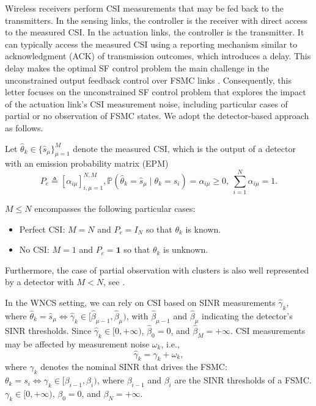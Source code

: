 \documentclass[journal,twoside,web]{ieeecolor}
\begin{document}
Wireless receivers perform CSI measurements that may be fed back to the transmitters. In the sensing links, the controller is the receiver with direct access to the measured CSI. In the actuation links, the controller is the transmitter. It can typically access the measured CSI using a reporting mechanism similar to acknowledgment (ACK) of transmission outcomes, which introduces a delay. This delay makes the optimal SF control problem the main challenge in the unconstrained output feedback control over FSMC links \cite{impicciatore2024tac}. Consequently, this letter focuses on the unconstrained SF control problem that explores the impact of the actuation link's CSI measurement noise, including particular cases of partial or no observation of FSMC states. We adopt the detector-based approach as follows.

Let $\hat{\theta}_k \in \{\hat{s}_{\mu}\}_{\mu=1}^{M}$ denote the measured CSI, which is the output of a detector with an emission probability matrix (EPM)
\begin{subequations}
\begin{equation}\label{eq:epm}
    P_{e}^{} \triangleq \left[\alpha_{i\mu}\right]_{i,\mu=1}^{N,M},
\end{equation}
\begin{equation}\label{eq:alpha}
   \mathbb{P}(\hat{\theta}_{k} = \hat{s}_{\mu} \mid \theta_{k} = s_i) = \alpha_{i\mu} \geq 0,~ \sum_{i=1}^N \alpha_{i\mu}= 1.
\end{equation}
\end{subequations}

$M\leq N$ encompasses the following particular cases:
\begin{itemize}
    \item Perfect CSI: $M=N$ and $P_e = I_N$ so that %
    $\theta_k$ is known.
    \item No CSI: $M=1$ and $P_e = \mathbf{1}$ so that $\theta_k$ is unknown.
\end{itemize}
Furthermore, the case of partial observation with clusters is also well represented by a detector with $M<N$, see \cite{costa2015detector}.

In the WNCS setting, we can rely on CSI based on SINR measurements $\hat{\gamma}_k$, where $\hat{\theta}_k = \hat{s}_{\mu} \Leftrightarrow\hat{\gamma}_k\in [\hat{\beta}_{\mu-1},\hat{\beta}_{\mu})$, with $\hat{\beta}_{\mu-1}$ and $\hat{\beta}_{\mu}$ indicating the detector's SINR thresholds. Since $\hat{\gamma}_k \in [0,+\infty)$, $\hat{\beta}_0 = 0$, and $\hat{\beta}_{M}=+\infty$. CSI measurements may be affected by measurement noise $\omega_k$, i.e., 
\begin{equation}\label{eq:gamma-hat}
    \hat{\gamma}_k = \gamma_k + \omega_k,
\end{equation}
where $\gamma_k$ denotes the nominal SINR that drives the FSMC: 
$\theta_k = s_{i} \Leftrightarrow\gamma_k\in [\beta_{i-1},\beta_{i})$, where $\beta_{i-1}$ and $\beta_{i}$ are the SINR thresholds of a FSMC. $\gamma_k \in [0,+\infty)$, $\beta_0 = 0$, and $\beta_{N}=+\infty$.
\end{document}
